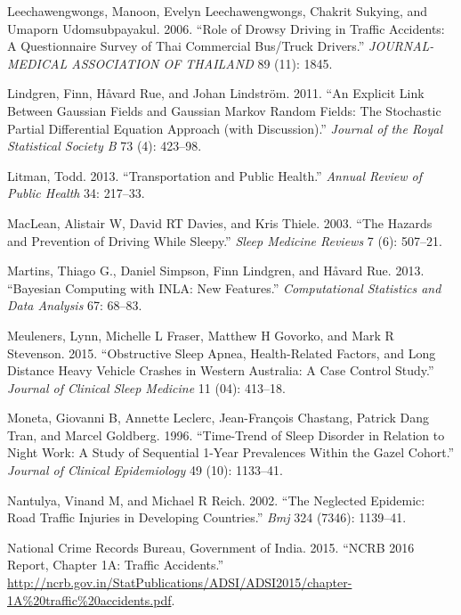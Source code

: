 \documentclass[12pt]{book}
\numberwithin{equation}{chapter}
\begin{document}
\leavevmode\hypertarget{ref-leechawengwongs2006role}{}%
Leechawengwongs, Manoon, Evelyn Leechawengwongs, Chakrit Sukying, and Umaporn Udomsubpayakul. 2006. ``Role of Drowsy Driving in Traffic Accidents: A Questionnaire Survey of Thai Commercial Bus/Truck Drivers.'' \emph{JOURNAL-MEDICAL ASSOCIATION OF THAILAND} 89 (11): 1845.

\leavevmode\hypertarget{ref-Lindgren2011}{}%
Lindgren, Finn, Håvard Rue, and Johan Lindström. 2011. ``An Explicit Link Between Gaussian Fields and Gaussian Markov Random Fields: The Stochastic Partial Differential Equation Approach (with Discussion).'' \emph{Journal of the Royal Statistical Society B} 73 (4): 423--98.

\leavevmode\hypertarget{ref-litman2013transportation}{}%
Litman, Todd. 2013. ``Transportation and Public Health.'' \emph{Annual Review of Public Health} 34: 217--33.

\leavevmode\hypertarget{ref-maclean2003hazards}{}%
MacLean, Alistair W, David RT Davies, and Kris Thiele. 2003. ``The Hazards and Prevention of Driving While Sleepy.'' \emph{Sleep Medicine Reviews} 7 (6): 507--21.

\leavevmode\hypertarget{ref-Thiago2013}{}%
Martins, Thiago G., Daniel Simpson, Finn Lindgren, and Håvard Rue. 2013. ``Bayesian Computing with INLA: New Features.'' \emph{Computational Statistics and Data Analysis} 67: 68--83.

\leavevmode\hypertarget{ref-meuleners2015obstructive}{}%
Meuleners, Lynn, Michelle L Fraser, Matthew H Govorko, and Mark R Stevenson. 2015. ``Obstructive Sleep Apnea, Health-Related Factors, and Long Distance Heavy Vehicle Crashes in Western Australia: A Case Control Study.'' \emph{Journal of Clinical Sleep Medicine} 11 (04): 413--18.

\leavevmode\hypertarget{ref-moneta1996time}{}%
Moneta, Giovanni B, Annette Leclerc, Jean-François Chastang, Patrick Dang Tran, and Marcel Goldberg. 1996. ``Time-Trend of Sleep Disorder in Relation to Night Work: A Study of Sequential 1-Year Prevalences Within the Gazel Cohort.'' \emph{Journal of Clinical Epidemiology} 49 (10): 1133--41.

\leavevmode\hypertarget{ref-nantulya2002neglected}{}%
Nantulya, Vinand M, and Michael R Reich. 2002. ``The Neglected Epidemic: Road Traffic Injuries in Developing Countries.'' \emph{Bmj} 324 (7346): 1139--41.

\leavevmode\hypertarget{ref-india2015}{}%
National Crime Records Bureau, Government of India. 2015. ``NCRB 2016 Report, Chapter 1A: Traffic Accidents.'' \url{http://ncrb.gov.in/StatPublications/ADSI/ADSI2015/chapter-1A\%20traffic\%20accidents.pdf}.
\end{document}
